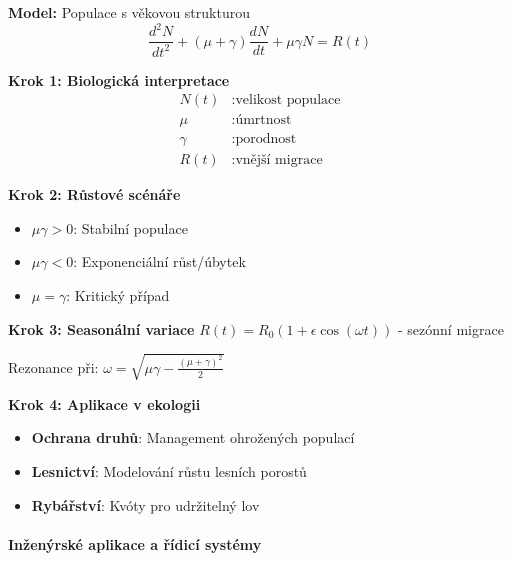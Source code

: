 \begin{example}
\label{ex:biologicke-modely}

\noindent\textbf{Model:} Populace s věkovou strukturou
\[
\frac{d^2N}{dt^2} + (\mu + \gamma)\frac{dN}{dt} + \mu\gamma N = R(t)
\]

\vspace{1.5\baselineskip}

\noindent\textbf{Krok 1: Biologická interpretace}
\begin{align*}
N(t) &: \text{velikost populace} \\
\mu &: \text{úmrtnost} \\
\gamma &: \text{porodnost} \\
R(t) &: \text{vnější migrace}
\end{align*}

\vspace{1\baselineskip}

\noindent\textbf{Krok 2: Růstové scénáře}
\begin{itemize}
\item $\mu\gamma > 0$: Stabilní populace
\item $\mu\gamma < 0$: Exponenciální růst/úbytek
\item $\mu = \gamma$: Kritický případ
\end{itemize}

\vspace{1\baselineskip}

\noindent\textbf{Krok 3: Seasonální variace}
$R(t) = R_0(1 + \epsilon\cos(\omega t))$ - sezónní migrace

Rezonance při: $\omega = \sqrt{\mu\gamma - \frac{(\mu + \gamma)^2}{2}}$

\vspace{1\baselineskip}

\noindent\textbf{Krok 4: Aplikace v ekologii}
\begin{itemize}
\item \textbf{Ochrana druhů}: Management ohrožených populací
\item \textbf{Lesnictví}: Modelování růstu lesních porostů
\item \textbf{Rybářství}: Kvóty pro udržitelný lov
\end{itemize}

\end{example}

\paragraph{Inženýrské aplikace a řídicí systémy}


